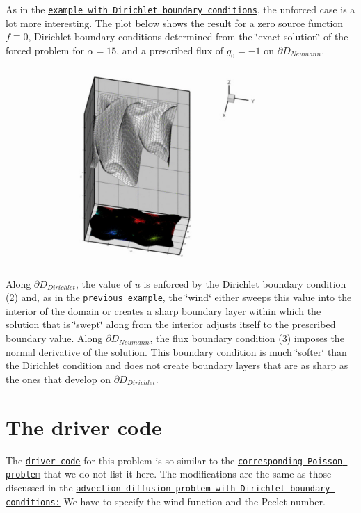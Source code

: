 As in the \href{../../two_d_adv_diff_adapt/html/index.html}{\tt example with Dirichlet boundary conditions}, the unforced case is a lot more interesting. The plot below shows the result for a zero source function $ f \equiv 0 $, Dirichlet boundary conditions determined from the \char`\"{}exact solution\char`\"{} of the forced problem for $ \alpha = 15$, and a prescribed flux of $ g_0 = -1 $ on $ \partial D_{Neumann}$.

 
\begin{DoxyImage}
\includegraphics[width=0.75\textwidth]{no_source}
\end{DoxyImage}


Along $ \partial D_{Dirichlet}$, the value of $ u $ is enforced by the Dirichlet boundary condition (2) and, as in the \href{../../two_d_adv_diff_adapt/html/index.html}{\tt previous example}, the \char`\"{}wind\char`\"{} either sweeps this value into the interior of the domain or creates a sharp boundary layer within which the solution that is \char`\"{}swept\char`\"{} along from the interior adjusts itself to the prescribed boundary value. Along $ \partial D_{Neumann}$, the flux boundary condition (3) imposes the normal derivative of the solution. This boundary condition is much \char`\"{}softer\char`\"{} than the Dirichlet condition and does not create boundary layers that are as sharp as the ones that develop on $ \partial D_{Dirichlet}$.



 

\hypertarget{index_code}{}\section{The driver code}\label{index_code}
The \href{../../../../demo_drivers/advection_diffusion/two_d_adv_diff_flux_bc/two_d_adv_diff_flux_bc.cc}{\tt driver code} for this problem is so similar to the \href{../../../poisson/two_d_poisson_flux_bc_adapt/html/index.html}{\tt corresponding Poisson problem} that we do not list it here. The modifications are the same as those discussed in the \href{../../two_d_adv_diff_adapt/html/index.html}{\tt advection diffusion problem with Dirichlet boundary conditions\+:} We have to specify the wind function and the Peclet number.




